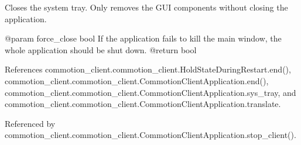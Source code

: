 \begin{DoxyVerb}Closes the system tray. Only removes the GUI components without closing the application.

@param force_close bool If the application fails to kill the main window, the whole application should be shut down.
@return bool 
\end{DoxyVerb}
 

References commotion\-\_\-client.\-commotion\-\_\-client.\-Hold\-State\-During\-Restart.\-end(), commotion\-\_\-client.\-commotion\-\_\-client.\-Commotion\-Client\-Application.\-end(), commotion\-\_\-client.\-commotion\-\_\-client.\-Commotion\-Client\-Application.\-sys\-\_\-tray, and commotion\-\_\-client.\-commotion\-\_\-client.\-Commotion\-Client\-Application.\-translate.



Referenced by commotion\-\_\-client.\-commotion\-\_\-client.\-Commotion\-Client\-Application.\-stop\-\_\-client().


